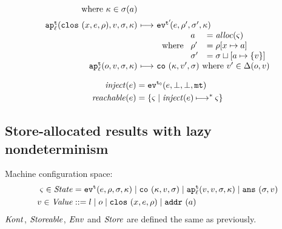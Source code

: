\documentclass{llncs}
\newcommand{\alt}{\mid}
\begin{document}
\begin{gather*}
\begin{array}{@{}r@{\ }c@{\ }l@{}}
\text{ where }\mkont\in\msto(\maddr)
\\[2mm]
\ap[^\mcntr_\mlab]{\clos{\mvar,\mexp,\menv},\mval,\msto,\mkont} & \machstep&
\ev[^{\mcntr'}\!]{\mexp,\menv',\msto',\mkont}
\\
\multicolumn{3}{r@{}}{
\text{ where }
\begin{array}{ll}
 \maddr &= \alloc(\mstate) \\
 \menv' &= \menv[\mvar \mapsto \maddr] \\
 \msto' &= \msto\sqcup[\maddr \mapsto\{\mval\}]
\end{array}}
\\
\ap[^\mcntr_\mlab]{\mop,\mval,\msto,\mkont} & \machstep&
\co{\mkont,\mval',\msto}
\text{ where } \mval'\in\interpdelta(\mop,\mval)
\end{array}
\end{gather*}

\begin{align*}
\inject(\mexp) &= \ev[^\mtcntr]{\mexp,\bot,\bot,\kmt} \\
\reachable{\mexp} &= \setof{\mstate \mid \inject(\mexp) \machstep^* \mstate}
\end{align*}

\subsection{Store-allocated results with lazy nondeterminism}

Machine configuration space:
\begin{align*}
\mstate \in \State &= \ev[^\mcntr]{\mexp, \menv, \msto, \mkont} \alt
                     \co{\mkont, \mval, \msto} \alt
                     \ap[_\mlab^\mcntr]{\mval,\mval,\msto,\mkont} \alt
                     \ans{\msto,\mval}\\
\mval \in \Value &::= \mlit \alt \mop \alt
                      \clos{\mvar,\mexp,\menv} \alt
                      \spchoice{\saddr\maddr}{\superposition{\mval{s}}}
\end{align*}
$\Kont$, $\Storeable$, $\Env$ and $\Store$ are defined the same as previously.
\end{document}
